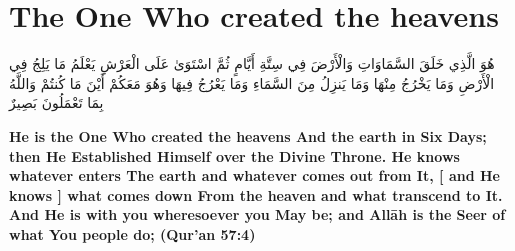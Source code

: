\chapter{The One Who created the heavens}
\begin{center}
    {\Huge    
        \begin{Arabic}
            هُوَ الَّذِي خَلَقَ السَّمَاوَاتِ وَالْأَرْضَ فِي سِتَّةِ أَيَّامٍ ثُمَّ اسْتَوَىٰ عَلَى الْعَرْشِ  يَعْلَمُ مَا يَلِجُ فِي الْأَرْضِ وَمَا يَخْرُجُ مِنْهَا وَمَا يَنزِلُ مِنَ السَّمَاءِ وَمَا يَعْرُجُ فِيهَا  وَهُوَ مَعَكُمْ أَيْنَ مَا كُنتُمْ  وَاللَّهُ بِمَا تَعْمَلُونَ بَصِيرٌ
        \end{Arabic}
    }
\end{center}
\vspace*{\fill}
\vspace{3cm}
\begin{center}
    \large \textbf{He is the One Who created the heavens And the earth in Six Days; then He Established Himself over the Divine Throne. He knows whatever enters The earth and whatever comes out from It, [ and He knows ] what comes down From the heaven and what transcend to It. And He is with you wheresoever you May be; and Allāh is the Seer of what You people do; (Qur'an 57:4)}
\end{center}
